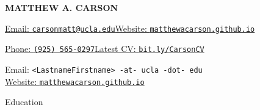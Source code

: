\documentclass[12pt]{resume} %
\begin{document}
\centerline{\MakeUppercase{\huge\bfseries{Matthew A. Carson}}}
\bigskip
{}
  {\centerline{\href{mailto:carsonmatt@ucla.edu}{Email: \texttt{carsonmatt@ucla.edu}}\hfill\href{http://matthewacarson.github.io}{Website: \texttt{matthewacarson.github.io}}}
  \centerline{\href{tel:9255650297}{Phone: \texttt{(925) 565-0297}}\hfill\href{https://bit.ly/CarsonCV}{Latest CV: \texttt{bit.ly/CarsonCV}}}}
  {Email: \texttt{<LastnameFirstname> -at- ucla -dot- edu}\\
  \href{http://matthewacarson.github.io}{Website: \texttt{matthewacarson.github.io}}}


\thispagestyle{firstpagestyle}
\raggedright
\renewcommand{\labelitemi}{\scriptsize$\bullet$}
\begin{rSection}{Education}

\end{rSection}
\end{document}
